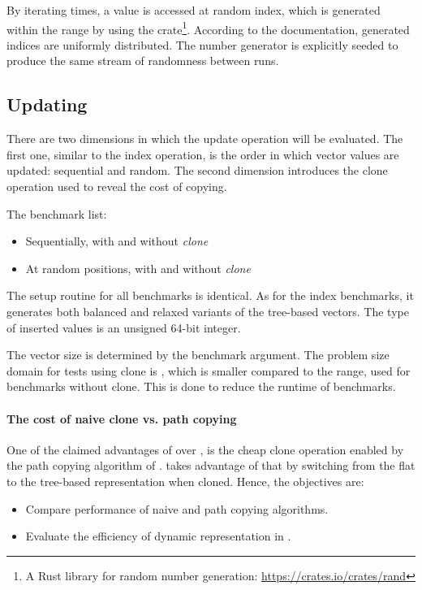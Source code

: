 By iterating \n{} times, a value is accessed at random index, which is generated within the \range{[0, N)} range by using the  crate\footnote{A Rust library for random number generation: \url{https://crates.io/crates/rand}}. According to the  documentation, generated indices are uniformly distributed. The number generator is explicitly seeded to produce the same stream of randomness between runs.

\subsection{Updating}
There are two dimensions in which the update operation will be evaluated. The first one, similar to the index operation, is the order in which vector values are updated: sequential and random. The second dimension introduces the clone operation used to reveal the cost of copying.

The benchmark list:
\begin{itemize}
    \item Sequentially, with and without \emph{clone}
    \item At random positions, with and without \emph{clone}
\end{itemize}

The setup routine for all benchmarks is identical. As for the index benchmarks, it generates both balanced and relaxed variants of the tree-based vectors. The type of inserted values is an unsigned 64-bit integer.

The vector size is determined by the benchmark argument. The problem size domain for tests using clone is \range{[20, \kilo{20}]}, which is smaller compared to the \range{[20, \kilo{100}]} range, used for benchmarks without clone. This is done to reduce the runtime of benchmarks.

\paragraph{The cost of naive clone vs. path copying}
One of the claimed advantages of \rbvec{} over \stdvec{}, is the cheap clone operation enabled by the path copying algorithm of \rbtree{}. \pvec{} takes advantage of that by switching from the flat to the tree-based representation when cloned. Hence, the objectives are:
\begin{itemize}
    \item Compare performance of naive and path copying algorithms.
    \item Evaluate the efficiency of dynamic representation in \pvec{}.
\end{itemize}

